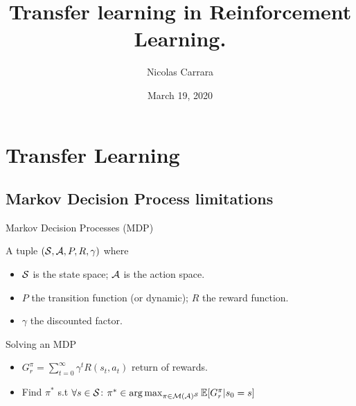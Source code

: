 \documentclass{beamer}
\author[shortname]{
    Nicolas Carrara  }
\institute[shortinst]{University of Toronto}
\title[]{Transfer learning in Reinforcement Learning.}
\date{March 19, 2020}
\begin{document}
    \begin{frame}
        \maketitle
        \centering
    \end{frame}


    \section{Transfer Learning}

    \subsection{Markov Decision Process limitations}

    \begin{frame}
        \begin{block}{Markov Decision Processes (MDP)}

            A tuple $(\mathcal{S}, \mathcal{A}, P, R, \gamma)$ where

            \begin{itemize}
                \item $\mathcal{S}$ is the state space; $\mathcal{A}$ is the action space.
                \item $P$ the transition function (or dynamic); $R$ the reward function.
                \item $\gamma$ the discounted factor.
            \end{itemize}
        \end{block}

        \pause
        \begin{block}{Solving an MDP}
            \begin{itemize}
                \item $G_r^\pi = \sum_{t=0}^\infty \gamma^t R(s_t, a_t)$ return of rewards.
                \item Find $\pi^*$ s.t $\forall s\in\mathcal{S}$: $\pi^* \in \operatorname*{arg\,max}_{\pi\in\mathcal{M}(\mathcal{A})^{\mathcal{S}}} \operatorname*{\mathbb{E}}[G_r^\pi | s_0=s]$


\end{itemize}
\end{block}
\end{frame}
\end{document}
